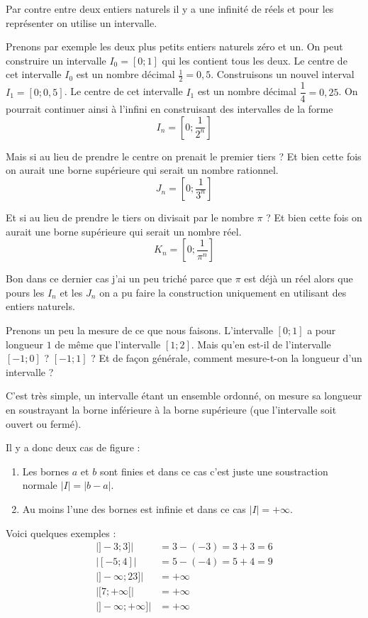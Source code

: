 \documentclass[a4paper, 11pt, twoside]{article}
\begin{document}
Par contre entre deux entiers naturels il y a une infinité de réels
et pour les représenter on utilise un intervalle.

Prenons par exemple les deux plus petits entiers naturels zéro et
un. On peut construire un intervalle \(I_0 = [0 ; 1]\) qui les contient
tous les deux. Le centre de cet intervalle \(I_0\) est un nombre décimal
\(\frac{1}{2} = 0,5\). Construisons un nouvel interval \(I_1 = [0;
   0,5]\). Le centre de cet intervalle \(I_1\) est un nombre décimal
\(\dfrac{1}{4} = 0,25\). On pourrait continuer ainsi à l'infini en
construisant des intervalles de la forme \[I_n = \left[0 ;
   \dfrac{1}{2^n}\right]\]

Mais si au lieu de prendre le centre on prenait le premier tiers ?
Et bien cette fois on aurait une borne supérieure qui serait un
nombre rationnel. \[J_n = \left[0 ; \dfrac{1}{3^n}\right]\]

Et si au lieu de prendre le tiers on divisait par le nombre \(\pi\) ?
Et bien cette fois on aurait une borne supérieure qui serait un
nombre réel. \[K_n = \left[0 ; \dfrac{1}{\pi^n}\right]\]

Bon dans ce dernier cas j'ai un peu triché parce que \(\pi\) est déjà
un réel alors que pours les \(I_n\) et les \(J_n\) on a pu faire la
construction uniquement en utilisant des entiers naturels.

Prenons un peu la mesure de ce que nous faisons. L'intervalle \([0 ;
   1]\) a pour longueur \(1\) de même que l'intervalle \([1 ; 2]\). Mais
qu'en est-il de l'intervalle \([-1 ; 0]\) ? \([-1 ; 1]\) ? Et de façon
générale, comment mesure-t-on la longueur d'un intervalle ?

C'est très simple, un intervalle étant un ensemble ordonné, on
mesure sa longueur en soustrayant la borne inférieure à la borne
supérieure (que l'intervalle soit ouvert ou fermé).

Il y a donc deux cas de figure :
\begin{enumerate}
\item Les bornes \(a\) et \(b\) sont finies et dans ce cas c'est juste une
soustraction normale \(|I| = |b - a|\).
\item Au moins l'une des bornes est infinie et dans ce cas \(|I| =
      +\infty\).
\end{enumerate}

Voici quelques exemples :
\begin{align*}
\lvert ]-3 ; 3] \rvert &= 3 - (-3) = 3 + 3 = 6\\
\lvert [-5 ; 4] \rvert &= 5 - (-4) = 5 + 4 = 9\\
\lvert ]-\infty ; 23] \rvert &= +\infty\\
\lvert [7 ; +\infty[ \rvert &= +\infty\\
\lvert ]-\infty ; +\infty] \rvert &= +\infty
\end{align*}
\end{document}
